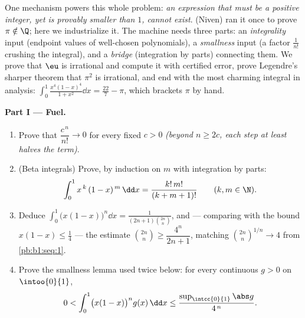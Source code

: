 \begin{problem}
\label{pb:b1:integration:1}
One mechanism powers this whole problem: \emph{an expression that
must be a positive integer, yet is provably smaller than $1$,
cannot exist}.  (Niven) ran it once to
prove $\pi \notin \Q$; here we industrialize it. The machine
needs three parts: an \emph{integrality} input (endpoint values
of well-chosen polynomials), a \emph{smallness} input (a factor
$\frac{1}{n!}$ crushing the integral), and a \emph{bridge}
(integration by parts) connecting them. We prove that $\eu$ is
irrational and compute it with certified error, prove Legendre's
sharper theorem that $\pi^2$ is irrational, and end with the
most charming integral in analysis: $\int_0^1 \frac{x^4(1 -
x)^4}{1 + x^2}\dd x = \frac{22}{7} - \pi$, which brackets $\pi$
by hand.

\medskip
\noindent\textbf{Part I --- Fuel.}
\begin{enumerate}
  \item Prove that $\dfrac{c^{\,n}}{n!} \to 0$ for every fixed $c
        > 0$ \emph{(beyond $n \geq 2c$, each step at least halves
        the term)}.
  \item (Beta integrals) Prove, by induction on $m$ with
        integration by parts:
        \[
        \int_0^1 x^{\,k}\,(1 - x)^{\,m}\,\dd x =
        \frac{k!\,m!}{(k + m + 1)!}
        \qquad (k, m \in \N).
        \]
  \item Deduce $\displaystyle\int_0^1 \bigl(x(1-x)\bigr)^n \dd x
        = \frac{1}{(2n+1)\binom{2n}{n}}$, and --- comparing with
        the bound $x(1 - x) \leq \frac14$ --- the estimate
        $\binom{2n}{n} \geq \dfrac{4^n}{2n+1}$, matching
        $\binom{2n}{n}^{1/n} \to 4$ from \cref{pb:b1:seq:1}.
  \item Prove the smallness lemma used twice below: for every
        continuous $g > 0$ on $\intoo{0}{1}$,
        \[
        0 < \int_0^1 \bigl(x(1-x)\bigr)^n g(x)\,\dd x
        \leq \frac{\sup_{\intcc{0}{1}}\abs g}{4^{\,n}} .
        \]
\end{enumerate}


\end{problem}
